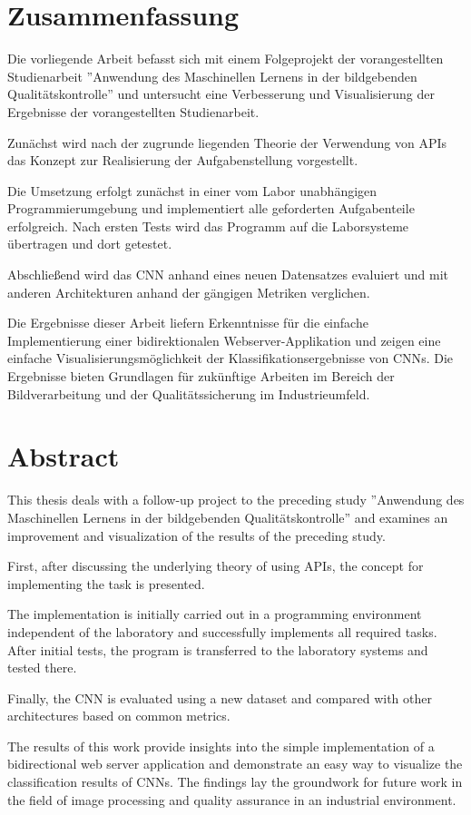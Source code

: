 \chapter*{Zusammenfassung}

Die vorliegende Arbeit befasst sich mit einem Folgeprojekt der vorangestellten Studienarbeit ''Anwendung des Maschinellen Lernens in der bildgebenden Qualitätskontrolle'' und untersucht eine Verbesserung und Visualisierung der Ergebnisse der vorangestellten Studienarbeit.

Zunächst wird nach der zugrunde liegenden Theorie der Verwendung von \ac{API}s das Konzept zur Realisierung der Aufgabenstellung vorgestellt.

Die Umsetzung erfolgt zunächst in einer vom Labor unabhängigen Programmierumgebung und implementiert alle geforderten Aufgabenteile erfolgreich. Nach ersten Tests wird das Programm auf die Laborsysteme übertragen und dort getestet.

Abschließend wird das \ac{CNN} anhand eines neuen Datensatzes evaluiert und mit anderen Architekturen anhand der gängigen Metriken verglichen.

Die Ergebnisse dieser Arbeit liefern Erkenntnisse für die einfache Implementierung einer bidirektionalen Webserver-Applikation und zeigen eine einfache Visualisierungsmöglichkeit der Klassifikationsergebnisse von \ac{CNN}s. Die Ergebnisse bieten Grundlagen für zukünftige Arbeiten im Bereich der Bildverarbeitung und der Qualitätssicherung im Industrieumfeld.


\chapter*{Abstract}

This thesis deals with a follow-up project to the preceding study ''Anwendung des Maschinellen Lernens in der bildgebenden Qualitätskontrolle'' and examines an improvement and visualization of the results of the preceding study.

First, after discussing the underlying theory of using \ac{API}s, the concept for implementing the task is presented.

The implementation is initially carried out in a programming environment independent of the laboratory and successfully implements all required tasks. After initial tests, the program is transferred to the laboratory systems and tested there.

Finally, the \ac{CNN} is evaluated using a new dataset and compared with other architectures based on common metrics.

The results of this work provide insights into the simple implementation of a bidirectional web server application and demonstrate an easy way to visualize the classification results of \ac{CNN}s. The findings lay the groundwork for future work in the field of image processing and quality assurance in an industrial environment.